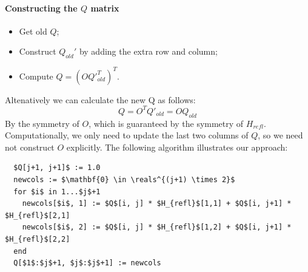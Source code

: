 \documentclass{article}
\newcommand{\reals}{\mathbb R}
\begin{document}
  \paragraph{Constructing the $Q$ matrix}
  \begin{itemize}
   \item Get old $Q$;
   \item Construct $Q_{old}'$ by adding the extra row and column;
   \item Compute $Q = (O Q'^T_{old})^T$. 
   
  \end{itemize}
  
  Altenatively we can calculate the new Q as follows:
  \[Q = O^T Q'_{old} = OQ_{old}\]
  By the symmetry of $O$, which is guaranteed by the symmetry of $H_{refl}$. Computationally, we only need to update the last two columns of $Q$, so we need not construct $O$ explicitly. The following algorithm illustrates our approach:

  \begin{algorithm}
\caption{Construction of $Q$ matrix}
\begin{lstlisting}
  $Q[j+1, j+1]$ := 1.0
  newcols := $\mathbf{0} \in \reals^{(j+1) \times 2}$
  for $i$ in 1...$j$+1
    newcols[$i$, 1] := $Q$[i, j] * $H_{refl}$[1,1] + $Q$[i, j+1] * $H_{refl}$[2,1]
    newcols[$i$, 2] := $Q$[i, j] * $H_{refl}$[1,2] + $Q$[i, j+1] * $H_{refl}$[2,2]
  end
  Q[$1$:$j$+1, $j$:$j$+1] := newcols
\end{lstlisting}

  \end{algorithm}

  
  \newpage
\end{document}

